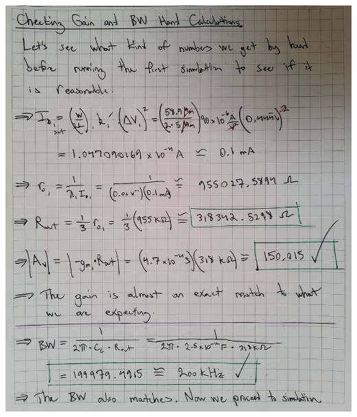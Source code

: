 \documentclass[12pt, fleqn]{article}
\begin{document}
\newpage
\includegraphics[scale=0.165, angle=90, center]{p2a_8.jpg}\\
\newpage
\end{document}
